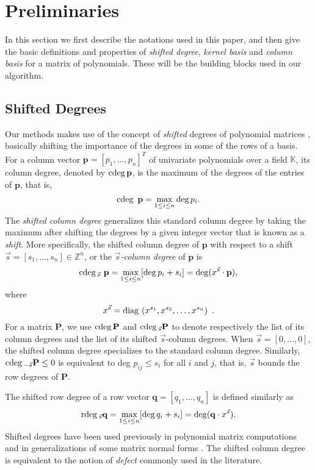 
\section{Preliminaries}

In this section we first describe the notations used in this paper,
and then give the basic definitions and properties of {\em shifted
degree}, {\em kernel basis} and {\em column basis} for a matrix
of polynomials. These will be the building blocks used in our algorithm.


\subsection{Shifted Degrees}

Our methods makes use of the concept of {\em shifted} degrees of
polynomial matrices \citep{BLV:1999}, basically shifting the importance
of the degrees in some of the rows of a basis. For a column vector
$\mathbf{p}=\left[p_{1},\dots,p_{n}\right]^{T}$ of univariate polynomials
over a field $\mathbb{K}$, its column degree, denoted by ${\rm cdeg}\,\mathbf{p}$,
is the maximum of the degrees of the entries of $\mathbf{p}$, that
is, 
\[
{\rm cdeg}\,~\mathbf{p}=\max_{1\le i\le n}\deg p_{i}.
\]
 The \emph{shifted column degree} generalizes this standard column
degree by taking the maximum after shifting the degrees by a given
integer vector that is known as a \emph{shift}. More specifically,
the shifted column degree of $\mathbf{p}$ with respect to a shift
$\vec{s}=\left[s_{1},\dots,s_{n}\right]\in\mathbb{Z}^{n}$, or the
\emph{$\vec{s}$-column degree} of $\mathbf{p}$ is 
\[
{\rm cdeg}\,_{\vec{s}}~\mathbf{p}=\max_{1\le i\le n}[\deg p_{i}+s_{i}]=\deg(x^{\vec{s}}\cdot\mathbf{p}),
\]
 where 
\[
x^{\vec{s}}={\rm diag}\,\left(x^{s_{1}},x^{s_{2}},\dots,x^{s_{n}}\right)~.
\]
 For a matrix $\mathbf{P}$, we use ${\rm cdeg}\,\mathbf{P}$ and ${\rm cdeg}\,_{\vec{s}}\mathbf{P}$
to denote respectively the list of its column degrees and the list
of its shifted $\vec{s}$-column degrees. When $\vec{s}=\left[0,\dots,0\right]$,
the shifted column degree specializes to the standard column degree.
Similarly, ${\rm cdeg}\,_{-\vec{s}}\mathbf{P}\leq0$ is equivalent to deg
$p_{ij}\leq s_{i}$ for all $i$ and $j$, that is, $\vec{s}$ bounds
the row degrees of $\mathbf{P}$.

The shifted row degree of a row vector \textbf{$\mathbf{q}=\left[q_{1},\dots,q_{n}\right]$}
is defined similarly as 
\[
{\rm rdeg}\,_{\vec{s}}\mathbf{q}=\max_{1\le i\le n}[\deg q_{i}+s_{i}]=\deg(\mathbf{q}\cdot x^{\vec{s}}).
\]
 Shifted degrees have been used previously in polynomial matrix computations
and in generalizations of some matrix normal forms \citep{BLV:jsc06}.
The shifted column degree is equivalent to the notion of \emph{defect}
commonly used in the literature.

